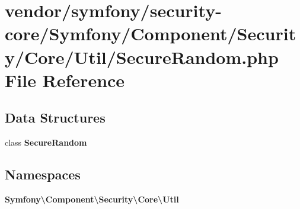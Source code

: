 \section{vendor/symfony/security-\/core/\+Symfony/\+Component/\+Security/\+Core/\+Util/\+Secure\+Random.php File Reference}
\label{_secure_random_8php}
\subsection*{Data Structures}
\begin{DoxyCompactItemize}
\item 
class {\bf Secure\+Random}
\end{DoxyCompactItemize}
\subsection*{Namespaces}
\begin{DoxyCompactItemize}
\item 
 {\bf Symfony\textbackslash{}\+Component\textbackslash{}\+Security\textbackslash{}\+Core\textbackslash{}\+Util}
\end{DoxyCompactItemize}
